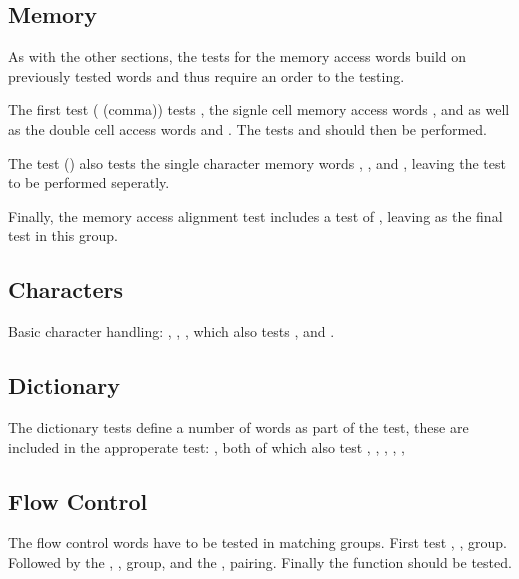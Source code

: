 \subsection{Memory}

As with the other sections, the tests for the memory access words
build on previously tested words and thus require an order to the
testing.

The first test ( (comma)) tests , the
signle cell memory access words , \word{!} and 
as well as the double cell access words  and .  The
tests  and  should then be
performed.

The test () also tests the single character memory
words , , and , leaving the test
 to be performed seperatly.

Finally, the memory access alignment test 
includes a test of , leaving \linebreak {}
as the final test in this group.

\subsection{Characters}

Basic character handling:
	,
	,
	,
	\tref{core:[}{[} which also tests \word{]}, and
	.

\subsection{Dictionary}

The dictionary tests define a number of words as part of the test,
these are included in the approperate test:
	,
	 both of which also test ,
	,
	,
	,
	,

\subsection{Flow Control}

The flow control words have to be tested in matching groups.
First test , ,  group.
Followed by the , ,
 group, and the , 
pairing.  Finally the  function should
be tested.

